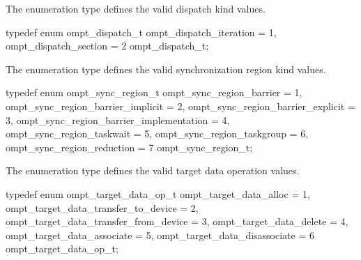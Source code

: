 \label{sec:ompt_dispatch_t}

\summary
The  enumeration type defines the valid dispatch kind values.

\format
\begin{ccppspecific}
\begin{omptEnum}
typedef enum ompt_dispatch_t {
  ompt_dispatch_iteration             = 1,
  ompt_dispatch_section               = 2
} ompt_dispatch_t;
\end{omptEnum}
\end{ccppspecific}



\label{sec:ompt_sync_region_t}

\summary
The  enumeration type defines the valid 
synchronization region kind values.

\format
\begin{ccppspecific}
\begin{omptEnum}
typedef enum ompt_sync_region_t {
  ompt_sync_region_barrier                = 1,
  ompt_sync_region_barrier_implicit       = 2,
  ompt_sync_region_barrier_explicit       = 3,
  ompt_sync_region_barrier_implementation = 4,
  ompt_sync_region_taskwait               = 5,
  ompt_sync_region_taskgroup              = 6,
  ompt_sync_region_reduction              = 7
} ompt_sync_region_t;
\end{omptEnum}
\end{ccppspecific}



\label{sec:ompt_target_data_op_t}

\summary
The  enumeration type defines the valid target 
data operation values.

\format
\begin{ccppspecific}
\begin{omptEnum}
typedef enum ompt_target_data_op_t {
  ompt_target_data_alloc                = 1,
  ompt_target_data_transfer_to_device   = 2,
  ompt_target_data_transfer_from_device = 3,
  ompt_target_data_delete               = 4,
  ompt_target_data_associate            = 5,
  ompt_target_data_disassociate         = 6
} ompt_target_data_op_t;
\end{omptEnum}
\end{ccppspecific}



